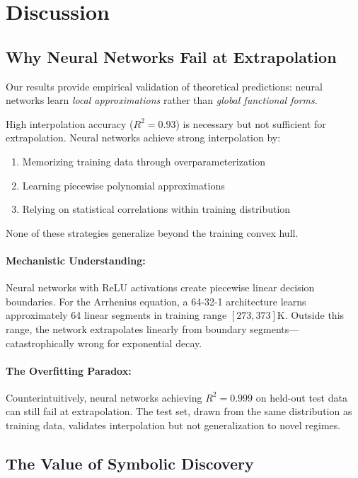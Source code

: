 \section{Discussion}
\label{sec:discussion}

\subsection{Why Neural Networks Fail at Extrapolation}

Our results provide empirical validation of theoretical predictions: neural networks learn \emph{local approximations} rather than \emph{global functional forms}.

\begin{remark}
High interpolation accuracy ($R^2 = 0.93$) is necessary but not sufficient for extrapolation. Neural networks achieve strong interpolation by:
\begin{enumerate}
\item Memorizing training data through overparameterization
\item Learning piecewise polynomial approximations
\item Relying on statistical correlations within training distribution
\end{enumerate}
None of these strategies generalize beyond the training convex hull.
\end{remark}

\paragraph{Mechanistic Understanding:} Neural networks with ReLU activations create piecewise linear decision boundaries. For the Arrhenius equation, a 64-32-1 architecture learns approximately 64 linear segments in training range $[273, 373]$K. Outside this range, the network extrapolates linearly from boundary segments---catastrophically wrong for exponential decay.

\paragraph{The Overfitting Paradox:} Counterintuitively, neural networks achieving $R^2 = 0.999$ on held-out test data can still fail at extrapolation. The test set, drawn from the same distribution as training data, validates interpolation but not generalization to novel regimes.

\subsection{The Value of Symbolic Discovery}

